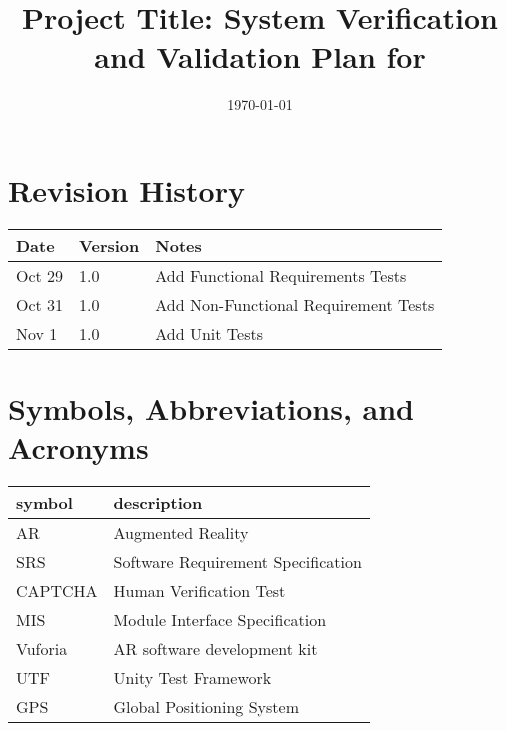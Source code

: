 \documentclass[12pt, titlepage]{article}
\begin{document}
\title{Project Title: System Verification and Validation Plan for \progname{}} 
\author{\authname}
\date{\today}
	
\maketitle


\section*{Revision History}

\begin{tabularx}{\textwidth}{p{3cm}p{2cm}X}
\toprule {\bf Date} & {\bf Version} & {\bf Notes}\\
\midrule
Oct 29 & 1.0 & Add Functional Requirements Tests\\
Oct 31 & 1.0 & Add Non-Functional Requirement Tests\\
Nov 1 & 1.0 & Add Unit Tests\\
\bottomrule
\end{tabularx}

\newpage

\tableofcontents

\listoftables

\newpage

\section{Symbols, Abbreviations, and Acronyms}

\renewcommand{\arraystretch}{1.2}
\begin{tabular}{l l} 
  \toprule		
  \textbf{symbol} & \textbf{description}\\
  \midrule 
  AR & Augmented Reality\\
  \midrule
  SRS & Software Requirement Specification\\
  \midrule
  CAPTCHA & Human Verification Test\\
  \midrule
  MIS & Module Interface Specification\\
  \midrule
  Vuforia & AR software development kit\\
  \midrule
  UTF & Unity Test Framework\\
  \midrule
  GPS & Global Positioning System\\
  \bottomrule
\end{tabular}\\
\end{document}
